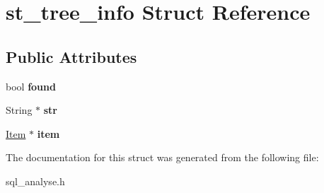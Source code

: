 \hypertarget{structst__tree__info}{}\section{st\+\_\+tree\+\_\+info Struct Reference}
\label{structst__tree__info}
\subsection*{Public Attributes}
\begin{DoxyCompactItemize}
\item 
\mbox{\label{structst__tree__info_af54179fe27adbdd1f50e27fe082aa2c3}} 
bool {\bfseries found}
\item 
\mbox{\label{structst__tree__info_a6ec8d0cb3a33b9717f2306dd6117b7df}} 
String $\ast$ {\bfseries str}
\item 
\mbox{\label{structst__tree__info_a0f29b5b937c537304f90b0b86341e7e9}} 
\mbox{\hyperlink{classItem}{Item}} $\ast$ {\bfseries item}
\end{DoxyCompactItemize}


The documentation for this struct was generated from the following file\+:\begin{DoxyCompactItemize}
\item 
sql\+\_\+analyse.\+h\end{DoxyCompactItemize}
